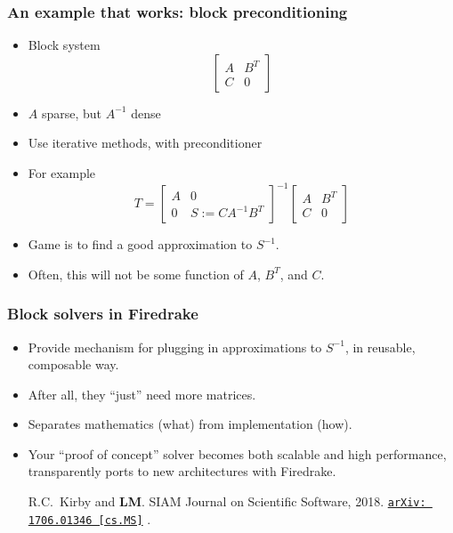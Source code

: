 \documentclass[presentation]{beamer}
\newcommand{\arxivlink}[2]{%
  \href{http://www.arxiv.org/abs/#1}%
  {\texttt{arXiv:\,#1\,[#2]}}%
}
\begin{document}
\begin{frame}
  \frametitle{An example that works: block preconditioning}
  \begin{itemize}
  \item Block system
    \begin{equation*}
    \begin{bmatrix}
      A & B^T \\
      C & 0
    \end{bmatrix}
  \end{equation*}
  \item $A$ sparse, but $A^{-1}$ dense
  \item Use iterative methods, with preconditioner
  \item For example  \begin{equation*}
      T = \begin{bmatrix}
        A & 0 \\
        0 & S := C A^{-1} B^T
      \end{bmatrix}^{-1}
      \begin{bmatrix}
        A & B^T \\
        C & 0
      \end{bmatrix}
    \end{equation*}
  \item Game is to find a good approximation to $S^{-1}$.
  \item Often, this will not be some function of $A$, $B^T$, and $C$.
  \end{itemize}
\end{frame}

\begin{frame}
  \frametitle{Block solvers in Firedrake}
  \begin{itemize}
  \item Provide mechanism for plugging in approximations to
    $S^{-1}$, in reusable, composable way.
  \item After all, they ``just'' need more matrices.
  \item Separates mathematics (what) from implementation (how).
  \item Your ``proof of concept'' solver becomes both scalable and
    high performance, transparently ports to new architectures with
    Firedrake.
    \begin{flushright}
      {\scriptsize R.C.~Kirby and \textbf{LM}. SIAM Journal on Scientific Software,
        2018. \arxivlink{1706.01346}{cs.MS}.}
    \end{flushright}
  \end{itemize}
\end{frame}
\end{document}
